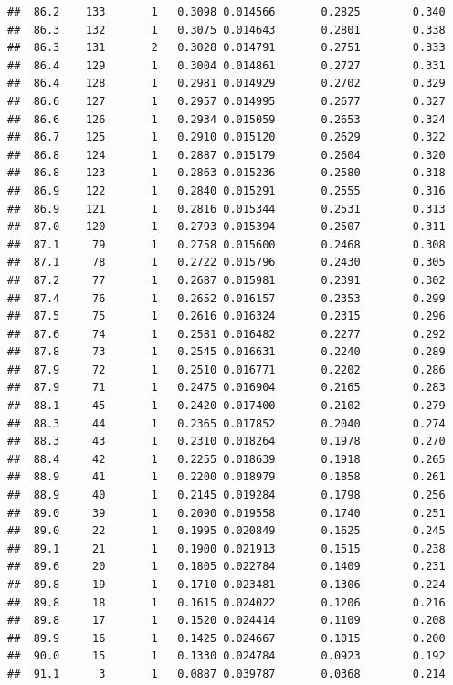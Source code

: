 \documentclass[
]{book}
\begin{document}
\begin{verbatim}
##  86.2    133       1   0.3098 0.014566       0.2825        0.340
##  86.3    132       1   0.3075 0.014643       0.2801        0.338
##  86.3    131       2   0.3028 0.014791       0.2751        0.333
##  86.4    129       1   0.3004 0.014861       0.2727        0.331
##  86.4    128       1   0.2981 0.014929       0.2702        0.329
##  86.6    127       1   0.2957 0.014995       0.2677        0.327
##  86.6    126       1   0.2934 0.015059       0.2653        0.324
##  86.7    125       1   0.2910 0.015120       0.2629        0.322
##  86.8    124       1   0.2887 0.015179       0.2604        0.320
##  86.8    123       1   0.2863 0.015236       0.2580        0.318
##  86.9    122       1   0.2840 0.015291       0.2555        0.316
##  86.9    121       1   0.2816 0.015344       0.2531        0.313
##  87.0    120       1   0.2793 0.015394       0.2507        0.311
##  87.1     79       1   0.2758 0.015600       0.2468        0.308
##  87.1     78       1   0.2722 0.015796       0.2430        0.305
##  87.2     77       1   0.2687 0.015981       0.2391        0.302
##  87.4     76       1   0.2652 0.016157       0.2353        0.299
##  87.5     75       1   0.2616 0.016324       0.2315        0.296
##  87.6     74       1   0.2581 0.016482       0.2277        0.292
##  87.8     73       1   0.2545 0.016631       0.2240        0.289
##  87.9     72       1   0.2510 0.016771       0.2202        0.286
##  87.9     71       1   0.2475 0.016904       0.2165        0.283
##  88.1     45       1   0.2420 0.017400       0.2102        0.279
##  88.3     44       1   0.2365 0.017852       0.2040        0.274
##  88.3     43       1   0.2310 0.018264       0.1978        0.270
##  88.4     42       1   0.2255 0.018639       0.1918        0.265
##  88.9     41       1   0.2200 0.018979       0.1858        0.261
##  88.9     40       1   0.2145 0.019284       0.1798        0.256
##  89.0     39       1   0.2090 0.019558       0.1740        0.251
##  89.0     22       1   0.1995 0.020849       0.1625        0.245
##  89.1     21       1   0.1900 0.021913       0.1515        0.238
##  89.6     20       1   0.1805 0.022784       0.1409        0.231
##  89.8     19       1   0.1710 0.023481       0.1306        0.224
##  89.8     18       1   0.1615 0.024022       0.1206        0.216
##  89.8     17       1   0.1520 0.024414       0.1109        0.208
##  89.9     16       1   0.1425 0.024667       0.1015        0.200
##  90.0     15       1   0.1330 0.024784       0.0923        0.192
##  91.1      3       1   0.0887 0.039787       0.0368        0.214
\end{verbatim}
\end{document}
